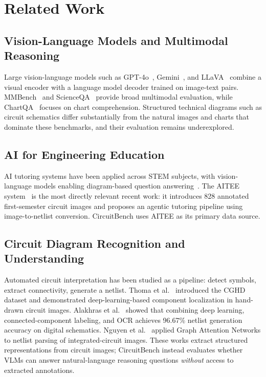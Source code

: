 \documentclass[conference]{IEEEtran}
\begin{document}
\section{Related Work}
\label{sec:related}

\subsection{Vision-Language Models and Multimodal Reasoning}

Large vision-language models such as GPT-4o~\cite{openai2024gpt4o},
Gemini~\cite{google2024gemini}, and LLaVA~\cite{liu2023llava}
combine a visual encoder with a language model decoder trained on
image-text pairs.
MMBench~\cite{liu2023mmbench} and ScienceQA~\cite{lu2022scienceqa}
provide broad multimodal evaluation, while ChartQA~\cite{masry2022chartqa}
focuses on chart comprehension.
Structured technical diagrams such as circuit schematics differ
substantially from the natural images and charts that dominate these
benchmarks, and their evaluation remains underexplored.

\subsection{AI for Engineering Education}

AI tutoring systems have been applied across STEM subjects, with
vision-language models enabling diagram-based question
answering~\cite{lu2022scienceqa}.
The AITEE system~\cite{knievel2025aitee_paper} is the most directly
relevant recent work: it introduces 828 annotated first-semester
circuit images and proposes an agentic tutoring pipeline using
image-to-netlist conversion.
CircuitBench uses AITEE as its primary data source.

\subsection{Circuit Diagram Recognition and Understanding}

Automated circuit interpretation has been studied as a pipeline:
detect symbols, extract connectivity, generate a netlist.
Thoma et al.~\cite{thoma2021cghd_paper} introduced the CGHD dataset
and demonstrated deep-learning-based component localization in hand-drawn
circuit images.
Alakhras et al.~\cite{alakhras2026sina} showed that combining deep
learning, connected-component labeling, and OCR achieves 96.67\%
netlist generation accuracy on digital schematics.
Nguyen et al.~\cite{nguyen2024circuitparse} applied Graph Attention
Networks to netlist parsing of integrated-circuit images.
These works extract structured representations from circuit images;
CircuitBench instead evaluates whether VLMs can answer natural-language
reasoning questions \emph{without} access to extracted annotations.
\end{document}
